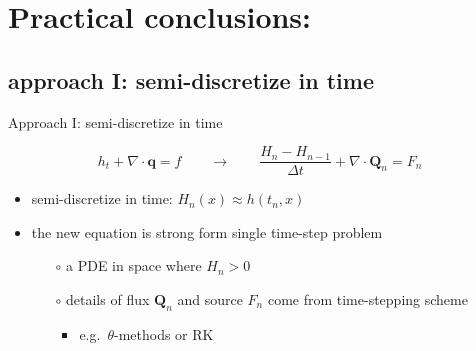 \documentclass{beamer}
\newcommand\bq{\mathbf{q}}
\newcommand\bQ{\mathbf{Q}}
\newcommand{\Div}{\nabla\cdot}
\begin{document}
\section{Practical conclusions:}

\subsection{approach I: semi-discretize in time}

\begin{frame}{Approach I: semi-discretize in time}

$$h_t + \Div\bq = f \qquad \to \qquad \frac{H_n - H_{n-1}}{\Delta t} + \Div \bQ_n = F_n$$

  \begin{itemize}
  \item semi-discretize in time: $H_n(x) \approx h(t_n,x)$
  \item the new equation is strong form \alert{single time-step problem}
    \begin{itemize}
    \item[$\circ$] a PDE in space where $H_n>0$
    \item[$\circ$] details of flux $\bQ_n$ and source $F_n$ come from time-stepping scheme
      \begin{itemize}
      \item e.g.~$\theta$-methods or RK
      \end{itemize}
    \end{itemize}
  \end{itemize}
\end{frame}
\end{document}
